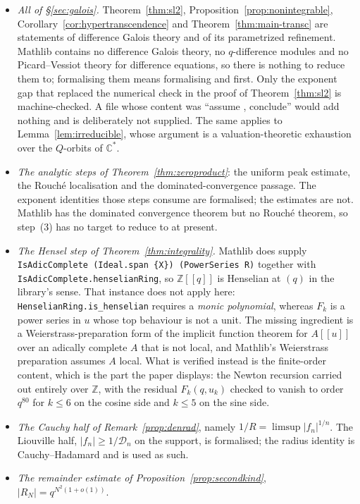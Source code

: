 \documentclass[11pt]{article}
\theoremstyle{plain}
\theoremstyle{definition}
\theoremstyle{remark}
\newcommand{\Z}{\mathbb{Z}}
\newcommand{\C}{\mathbb{C}}
\begin{document}
\begin{itemize}
\item \emph{All of \S\ref{sec:galois}.} Theorem~\ref{thm:sl2},
Proposition~\ref{prop:nonintegrable}, Corollary~\ref{cor:hypertranscendence} and
Theorem~\ref{thm:main-transc} are statements of difference Galois theory and of its parametrized
refinement. Mathlib contains no difference Galois theory, no $q$-difference modules and no
Picard--Vessiot theory for difference equations, so there is nothing to reduce them to;
formalising them means formalising \cite{HS} and \cite{DHR2018} first. Only the exponent gap that
replaced the numerical check in the proof of Theorem~\ref{thm:sl2} is machine-checked. A file
whose content was ``assume \cite[Prop.~2.9]{DHR2018}, conclude'' would add nothing and is
deliberately not supplied. The same applies to Lemma~\ref{lem:irreducible}, whose argument is a
valuation-theoretic exhaustion over the $Q$-orbits of $\C^\ast$.
\item \emph{The analytic steps of Theorem~\ref{thm:zeroproduct}}: the uniform peak estimate, the
Rouch\'e localisation and the dominated-convergence passage. The exponent identities those steps
consume are formalised; the estimates are not. Mathlib has the dominated convergence theorem but
no Rouch\'e theorem, so step~(3) has no target to reduce to at present.
\item \emph{The Hensel step of Theorem~\ref{thm:integrality}.} Mathlib does supply
\texttt{IsAdicComplete (Ideal.span \{X\}) (PowerSeries R)} together with
\texttt{IsAdicComplete.henselianRing}, so $\Z[[q]]$ is Henselian at $(q)$ in the library's sense.
That instance does not apply here: \texttt{HenselianRing.is\_henselian} requires a \emph{monic
polynomial}, whereas $F_k$ is a power series in $u$ whose top behaviour is not a unit. The missing
ingredient is a Weierstrass-preparation form of the implicit function theorem for $A[[u]]$ over an
adically complete $A$ that is not local, and Mathlib's Weierstrass preparation assumes $A$ local.
What is verified instead is the finite-order content, which is the part the paper displays: the
Newton recursion carried out entirely over $\Z$, with the residual $F_k(q,u_k)$ checked to vanish
to order $q^{80}$ for $k\le6$ on the cosine side and $k\le5$ on the sine side.
\item \emph{The Cauchy half of Remark~\ref{prop:denrad}}, namely
$1/R=\limsup|f_n|^{1/n}$. The Liouville half, $|f_n|\ge1/\mathcal D_n$ on the support, is
formalised; the radius identity is Cauchy--Hadamard and is used as such.
\item \emph{The remainder estimate of Proposition~\ref{prop:secondkind}}, $|R_N|=q^{N^2(1+o(1))}$.

\end{itemize}
\end{document}
